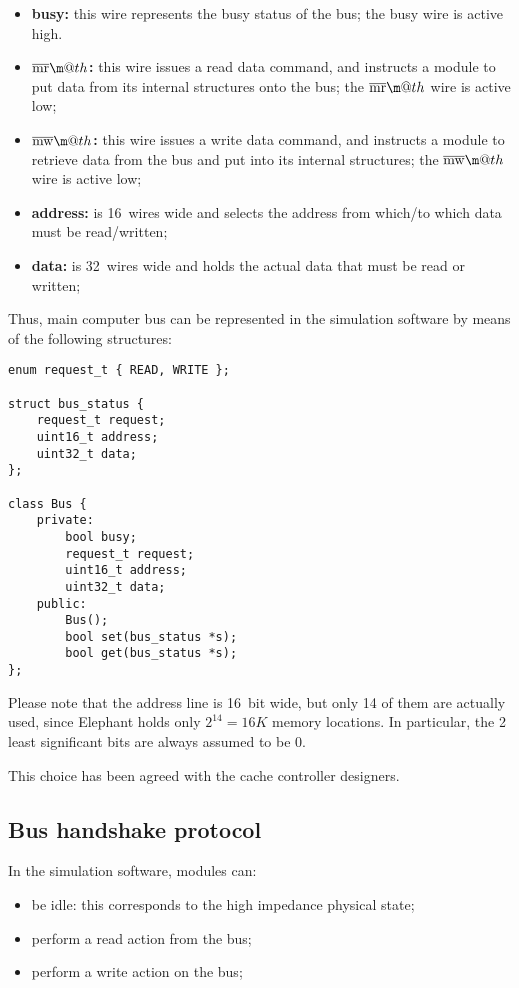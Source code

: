 \documentclass[a4paper,12pt]{article}
\makeatletter
\newcommand*{\textoverline}[1]{$\overline{\hbox{#1}}\m@th$}
\newcommand{\memoryname}{Elephant}
\makeatother
\begin{document}
\begin{itemize}
  \item \textbf{busy:} this wire represents the busy status of the bus; the busy wire is active high.
  \item \textbf{\textoverline{mr}:} this wire issues a read data command, and instructs a module to put data from its internal structures onto the bus; the \textoverline{mr} wire is active low;
  \item \textbf{\textoverline{mw}:} this wire issues a write data command, and instructs a module to retrieve data from the bus and put into its internal structures; the \textoverline{mw} wire is active low;
  \item \textbf{address:} is 16~wires wide and selects the address from which/to which data must be read/written;
  \item \textbf{data:} is 32~wires wide and holds the actual data that must be read or written;
\end{itemize}

Thus, main computer bus can be represented in the simulation software by means of the following structures:

\begin{verbatim}
enum request_t { READ, WRITE };

struct bus_status {
    request_t request;
    uint16_t address;
    uint32_t data;
};

class Bus {
    private:
        bool busy;
        request_t request;
        uint16_t address;
        uint32_t data;
    public:
        Bus();
        bool set(bus_status *s);
        bool get(bus_status *s);
};
\end{verbatim}

Please note that the address line is 16~bit wide, but only 14 of them are actually used, since \memoryname{} holds only $2^{14} = 16K$ memory locations.
In particular, the 2 least significant bits are always assumed to be 0.

This choice has been agreed with the cache controller designers.

\subsection{Bus handshake protocol}
In the simulation software, modules can:
\begin{itemize}
  \item be idle: this corresponds to the high impedance physical state;
  \item perform a read action from the bus;
  \item perform a write action on the bus;
\end{itemize}
\end{document}
